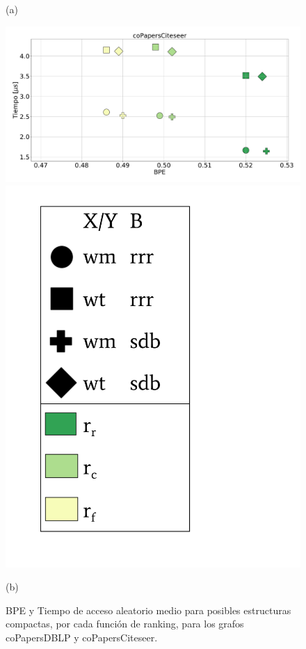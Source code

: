 \begin{figure}
\begin{minipage}{1\textwidth}
    			(a)		
    	\end{minipage}
    	
       	\begin{minipage}{1\textwidth}
    			\centering
    			\begin{minipage}{0.8\textwidth}
    				\centering
    				\includegraphics[width=1\linewidth]{img/sdsl/aleatorioBig/coPapersCiteseer.pdf}
    			\end{minipage}
    			\begin{minipage}{0.15\textwidth}
    				\centering
    				\includegraphics[scale=.22, clip, trim=70 0 0 0]{img/sdsl/label.pdf}
    			\end{minipage}
    			
    			(b)		
    	\end{minipage}
    	
    \caption{BPE y Tiempo de acceso aleatorio medio para posibles estructuras compactas, por cada función de ranking, para los grafos coPapersDBLP y coPapersCiteseer.}
    \label{fig:sdslBPEAle5}
\end{figure}
